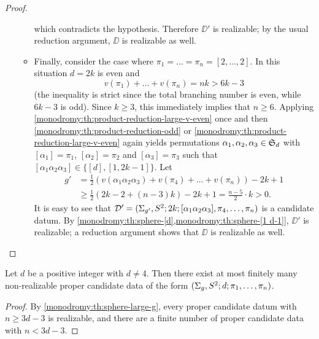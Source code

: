 \begin{proof}
\begin{itemize}
\begin{itemize}
\[\]
which contradicts the hypothesis. Therefore $\DD'$ is realizable; by the usual reduction argument, $\DD$ is realizable as well.
\item Finally, consider the case where $\pi_1=\ldots=\pi_n=[2,\ldots,2]$. In this situation $d=2k$ is even and
\[
v(\pi_1)+\ldots+v(\pi_n)=nk>6k-3
\]
(the inequality is strict since the total branching number is even, while $6k-3$ is odd). Since $k\ge 3$, this immediately implies that $n\ge 6$. Applying \cref{monodromy:th:product-reduction-large-v-even} once and then \cref{monodromy:th:product-reduction-odd} or \cref{monodromy:th:product-reduction-large-v-even} again yields permutations $\alpha_1,\alpha_2,\alpha_3\in\symgroup[d]$ with $[\alpha_1]=\pi_1$, $[\alpha_2]=\pi_2$ and $[\alpha_3]=\pi_3$ such that $[\alpha_1\alpha_2\alpha_3]\in\{[d],[1,2k-1]\}$. Let
\begin{align*}
g'&=\frac{1}{2}(v(\alpha_1\alpha_2\alpha_3)+v(\pi_4)+\ldots+v(\pi_n))-2k+1\\
&\ge\frac{1}{2}(2k-2+(n-3)k)-2k+1=\frac{n-5}{2}\cdot k>0.
\end{align*}
It is easy to see that $\mathcal{D}'=(\Sigma_{g'},S^2{};2k;[\alpha_1\alpha_2\alpha_3],\pi_4,\ldots,\pi_n)$ is a candidate datum. By \cref{monodromy:th:sphere-[d],monodromy:th:sphere-[1 d-1]}, $\DD'$ is realizable; a reduction argument shows that  $\DD$ is realizable as well.\qedhere
\end{itemize} 
\end{itemize}
\end{proof}

\begin{corollary}
Let $d$ be a positive integer with $d\neq 4$. Then there exist at most finitely many non-realizable proper candidate data of the form $(\Sigma_{g},S^2{};d;\pi_1,\ldots,\pi_n)$.
\end{corollary}
\begin{proof}
By \cref{monodromy:th:sphere-large-g}, every proper candidate datum with $n\ge 3d-3$ is realizable, and there are a finite number of proper candidate data with $n<3d-3$.
\end{proof}

